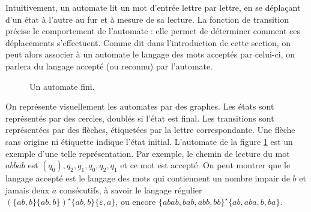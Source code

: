 Intuitivement, un automate lit un mot d'entrée lettre par lettre, en se déplaçant d'un état à l'autre au fur et à mesure de sa lecture.
La fonction de transition précise le comportement de l'automate : elle permet de déterminer comment ces déplacements s'effectuent.
Comme dit dans l'introduction de cette section, on peut alors associer à un automate le langage des mots acceptés par celui-ci, on parlera du langage accepté (ou reconnu) par l'automate.

\begin{figure}
\centering
{}
\caption{Un automate fini.}
\label{sk:fig:dfa1}
\end{figure}

On représente visuellement les automates par des graphes. Les états sont représentés par des cercles, doublés si l'état est final. Les transitions sont représentées par des flèches, étiquetées par la lettre correspondante. Une flèche sans origine ni étiquette indique l'état initial. L'automate de la figure \ref{sk:fig:dfa1} est un exemple d'une telle représentation. Par exemple, le chemin de lecture du mot $abbab$ est $(q_0), q_2, q_1, q_0, q_2, q_1$ et ce mot est accepté. On peut montrer que le langage accepté est le langage des mots qui contiennent un nombre impair de $b$ et jamais deux $a$ consécutifs, à savoir le langage régulier $(\{ab, b\}\{ab, b\})^\star \{ab, b\}\{\varepsilon, a\}$, ou encore $\{abab, bab, abb, bb\}^\star \{ab, aba, b, ba\}$.

